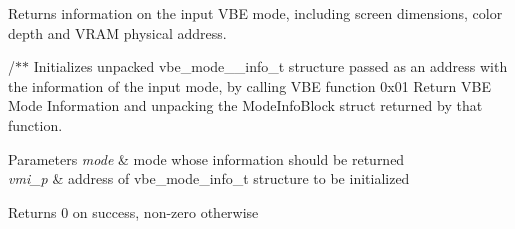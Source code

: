 Returns information on the input V\+BE mode, including screen dimensions, color depth and V\+R\+AM physical address. 

/$\ast$$\ast$ Initializes unpacked vbe\+\_\+mode\+\_\+\+\_\+info\+\_\+t structure passed as an address with the information of the input mode, by calling V\+BE function 0x01 Return V\+BE Mode Information and unpacking the Mode\+Info\+Block struct returned by that function.


\begin{DoxyParams}{Parameters}
{\em mode} & mode whose information should be returned \\
\hline
{\em vmi\+\_\+p} & address of vbe\+\_\+mode\+\_\+info\+\_\+t structure to be initialized \\
\hline
\end{DoxyParams}
\begin{DoxyReturn}{Returns}
0 on success, non-\/zero otherwise 
\end{DoxyReturn}
